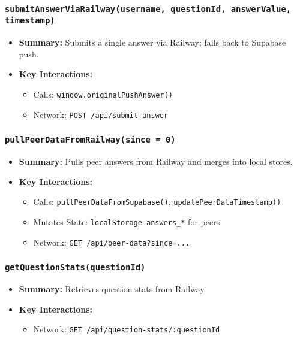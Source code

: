 \documentclass[11pt,letterpaper]{article}
\begin{document}
\subsubsection{\texttt{submitAnswerViaRailway(username, questionId, answerValue, timestamp)}}
\begin{itemize}
    \item \textbf{Summary:} Submits a single answer via Railway; falls back to Supabase push.
    \item \textbf{Key Interactions:}
    \begin{itemize}
        \item Calls: \texttt{window.originalPushAnswer()}
        \item Network: \texttt{POST /api/submit-answer}
    \end{itemize}
\end{itemize}

\subsubsection{\texttt{pullPeerDataFromRailway(since = 0)}}
\begin{itemize}
    \item \textbf{Summary:} Pulls peer answers from Railway and merges into local stores.
    \item \textbf{Key Interactions:}
    \begin{itemize}
        \item Calls: \texttt{pullPeerDataFromSupabase()}, \texttt{updatePeerDataTimestamp()}
        \item Mutates State: \texttt{localStorage answers\_*} for peers
        \item Network: \texttt{GET /api/peer-data?since=...}
    \end{itemize}
\end{itemize}

\subsubsection{\texttt{getQuestionStats(questionId)}}
\begin{itemize}
    \item \textbf{Summary:} Retrieves question stats from Railway.
    \item \textbf{Key Interactions:}
    \begin{itemize}
        \item Network: \texttt{GET /api/question-stats/:questionId}
    \end{itemize}
\end{itemize}
\end{document}
